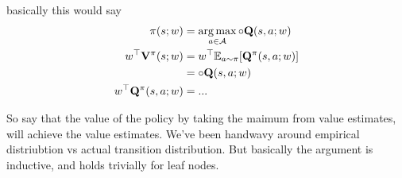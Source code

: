     basically this would say
    \begin{align}
        \pi(s;w) &= \operatorname*{arg\,max}_{a\in\mathcal{A}} \circ{\mathbf{Q}}(s,a;w) \\
        w^\top\mathbf{V}^\pi(s;w) &= w^\top \mathbb{E}_{a\sim\pi}[ \mathbf{Q}^\pi(s,a;w)] \\
            &= \circ{\mathbf{Q}}(s,a;w) \\
        w^\top\mathbf{Q}^\pi(s,a;w) &= ...    
    \end{align}

    So say that the value of the policy by taking the maimum from value estimates, will achieve the value estimates. We've been handwavy around empirical distriubtion vs actual transition distribution. But basically the argument is inductive, and holds trivially for leaf nodes.